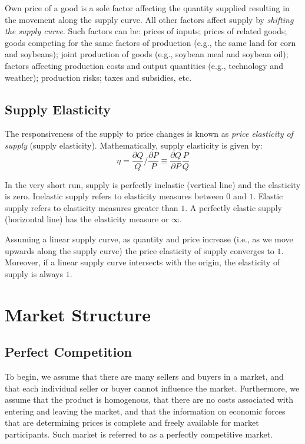 \documentclass[
]{book}
\begin{document}
Own price of a good is a sole factor affecting the quantity supplied resulting in the movement along the supply curve. All other factors affect supply by \emph{shifting the supply curve}. Such factors can be: prices of inputs; prices of related goods; goods competing for the same factors of production (e.g., the same land for corn and soybeans); joint production of goods (e.g., soybean meal and soybean oil); factors affecting production costs and output quantities (e.g., technology and weather); production risks; taxes and subsidies, etc.

\hypertarget{supply-elasticity}{%
\subsection{Supply Elasticity}\label{supply-elasticity}}

The responsiveness of the supply to price changes is known as \emph{price elasticity of supply} (supply elasticity). Mathematically, supply elasticity is given by: \[\eta = \frac{\partial Q}{Q}/\frac{\partial P}{P} \equiv \frac{\partial Q}{\partial P}\frac{P}{Q}\]

In the very short run, supply is perfectly inelastic (vertical line) and the elasticity is zero. Inelastic supply refers to elasticity measures between \(0\) and \(1\). Elastic supply refers to elasticity measures greater than \(1\). A perfectly elastic supply (horizontal line) has the elasticity measure or \(\infty\).

Assuming a linear supply curve, as quantity and price increase (i.e., as we move upwards along the supply curve) the price elasticity of supply converges to \(1\). Moreover, if a linear supply curve intersects with the origin, the elasticity of supply is always \(1\).

\hypertarget{market-structure}{%
\section{Market Structure}\label{market-structure}}

\hypertarget{perfect-competition}{%
\subsection{Perfect Competition}\label{perfect-competition}}

To begin, we assume that there are many sellers and buyers in a market, and that each individual seller or buyer cannot influence the market. Furthermore, we assume that the product is homogenous, that there are no costs associated with entering and leaving the market, and that the information on economic forces that are determining prices is complete and freely available for market participants. Such market is referred to as a perfectly competitive market.
\end{document}
